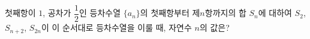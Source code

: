 첫째항이 $1$, 공차가 $\dfrac{1}{2}$인 등차수열 $\{a_n\}$의 첫째항부터 제$n$항까지의 합 $S_n$에 대하여 $S_2$, $S_{n+2}$, $S_{2n}$이 이 순서대로 등차수열을 이룰 때, 자연수 $n$의 값은?

